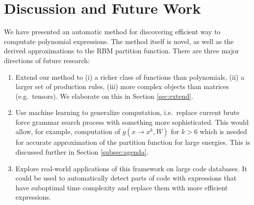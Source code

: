 \section{Discussion and Future Work}

We have presented an automatic method for discovering efficient way to
computate polynomial expressions. The method itself is novel, as well as the derived
approximations to the RBM partition function. There are three
major directions of future research: 

\begin{enumerate}
  \item Extend our method to (i) a richer class of functions
    than polynomials, (ii) a larger set of production rules, (iii) more complex
    objects than matrices (e.g.~tensors). We elaborate on this in
    Section \ref{sec:extend}.

  \item Use machine learning to generalize computation, i.e.~replace 
    current brute force grammar search process with something more
    sophisticated. This would allow, for example, computation of
$g(x \rightarrow x^k, W)$ for $k > 6$ which is needed for accurate
approximation of the partition function for large energies. This is discussed further in
Section \ref{subsec:agenda}.



\item Explore real-world applications of this framework on large code databases. 
  It could be used to automatically detect parts of code with expressions that have suboptimal 
  time complexity and replace them with more efficient expressions.
\end{enumerate}



